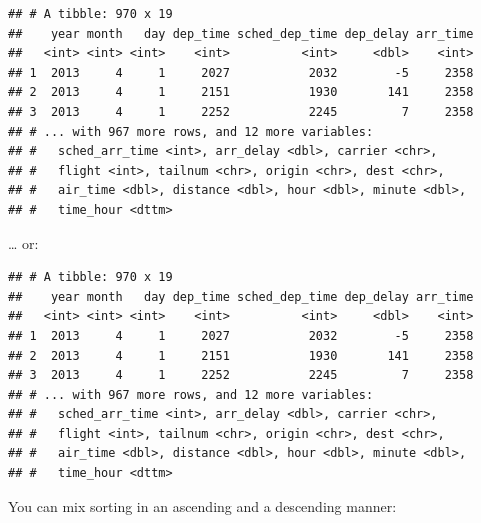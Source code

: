 \documentclass[]{book}
\newenvironment{Shaded}{}{}
\newcommand{\DecValTok}[1]{#1}
\newcommand{\KeywordTok}[1]{\textcolor[rgb]{0.00,0.00,1.00}{#1}}
\newcommand{\NormalTok}[1]{#1}
\newcommand{\OperatorTok}[1]{#1}
\newcommand{\StringTok}[1]{\textcolor[rgb]{0.00,0.50,0.50}{#1}}
\begin{document}
\begin{verbatim}
## # A tibble: 970 x 19
##    year month   day dep_time sched_dep_time dep_delay arr_time
##   <int> <int> <int>    <int>          <int>     <dbl>    <int>
## 1  2013     4     1     2027           2032        -5     2358
## 2  2013     4     1     2151           1930       141     2358
## 3  2013     4     1     2252           2245         7     2358
## # ... with 967 more rows, and 12 more variables:
## #   sched_arr_time <int>, arr_delay <dbl>, carrier <chr>,
## #   flight <int>, tailnum <chr>, origin <chr>, dest <chr>,
## #   air_time <dbl>, distance <dbl>, hour <dbl>, minute <dbl>,
## #   time_hour <dttm>
\end{verbatim}

\ldots{} or:

\begin{Shaded}
\end{Shaded}

\begin{verbatim}
## # A tibble: 970 x 19
##    year month   day dep_time sched_dep_time dep_delay arr_time
##   <int> <int> <int>    <int>          <int>     <dbl>    <int>
## 1  2013     4     1     2027           2032        -5     2358
## 2  2013     4     1     2151           1930       141     2358
## 3  2013     4     1     2252           2245         7     2358
## # ... with 967 more rows, and 12 more variables:
## #   sched_arr_time <int>, arr_delay <dbl>, carrier <chr>,
## #   flight <int>, tailnum <chr>, origin <chr>, dest <chr>,
## #   air_time <dbl>, distance <dbl>, hour <dbl>, minute <dbl>,
## #   time_hour <dttm>
\end{verbatim}

You can mix sorting in an ascending and a descending manner:

\begin{Shaded}
\end{Shaded}
\end{document}
